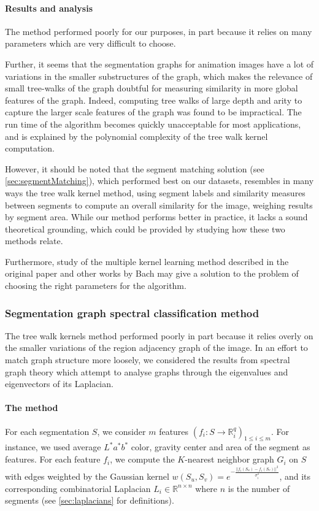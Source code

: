 \paragraph{Results and analysis} The method performed poorly for our purposes, in part because it relies on many parameters which are very difficult to choose.

Further, it seems that the segmentation graphs for animation images have a lot of variations in the smaller substructures of the graph, which makes the relevance of small tree-walks of the graph doubtful for measuring similarity in more global features of the graph. Indeed, computing tree walks of large depth and arity to capture the larger scale features of the graph was found to be impractical. The run time of the algorithm becomes quickly unacceptable for most applications, and is explained by the polynomial complexity of the tree walk kernel computation.

However, it should be noted that the segment matching solution (see \autoref{sec:segmentMatching}), which performed best on our datasets, resembles in many ways the tree walk kernel method, using segment labels and similarity measures between segments to compute an overall similarity for the image, weighing results by segment area. While our method performs better in practice, it lacks a sound theoretical grounding, which could be provided by studying how these two methods relate.

Furthermore, study of the multiple kernel learning method described in the original paper and other works by Bach \cite{bach2004multiple} may give a solution to the problem of choosing the right parameters for the algorithm.

\subsubsection{Segmentation graph spectral classification method}
The tree walk kernels method performed poorly in part because it relies overly on the smaller variations of the region adjacency graph of the image. In an effort to match graph structure more loosely, we considered the results from spectral graph theory which attempt to analyse graphs through the eigenvalues and eigenvectors of its Laplacian. 

\paragraph{The method} For each segmentation $S$, we consider $m$ features $(f_i : S \rightarrow \mathbb{R}_i^q)_{1 \leq i \leq m}$. For instance, we used average $L^*a^*b^*$ color, gravity center and area of the segment as features. For each feature $f_i$, we compute the $K$-nearest neighbor graph $G_i$ on $S$ with edges weighted by the Gaussian kernel $w(S_u,S_v) = e^{-\frac{||f_i(S_u) - f_i(S_v)||^2}{\sigma_i^2}}$, and its corresponding combinatorial Laplacian  $L_i \in \mathbb{R}^{n \times n}$ where $n$ is the number of segments (see \autoref{sec:laplacians} for definitions).

